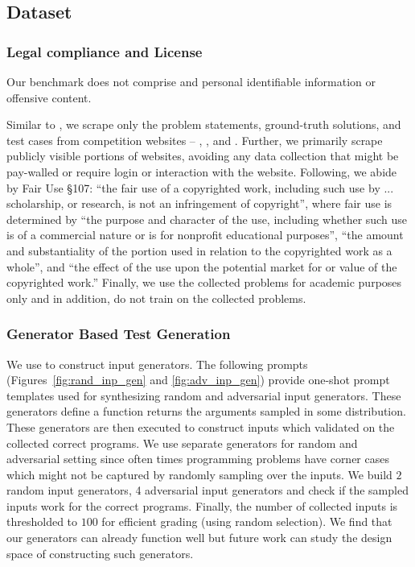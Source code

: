 \subsection{Dataset}
\label{app:sec:dataset}

\subsubsection{Legal compliance and License}
Our benchmark does not comprise and personal identifiable information or offensive content.

Similar to \citep{hendrycks2021measuring}, we scrape only the problem statements, ground-truth solutions, and test cases from competition websites -- \leetcode{}, \atcoder{}, and \codeforces{}. 
Further, we primarily scrape publicly visible portions of websites, avoiding any data collection that might be pay-walled or require login or interaction with the website.
Following, \citep{hendrycks2021measuring} we abide by Fair Use §107: “the fair
use of a copyrighted work, including such use by ... scholarship, or research, is not an infringement
of copyright”, where fair use is determined by “the purpose and character of the use, including
whether such use is of a commercial nature or is for nonprofit educational purposes”, “the amount
and substantiality of the portion used in relation to the copyrighted work as a whole”, and “the effect
of the use upon the potential market for or value of the copyrighted work.” 
Finally, we use the collected problems for academic purposes only and in addition, do not train on the collected problems.



\subsubsection{Generator Based Test Generation}
\label{appendix:input-generators}
We use \gptfourturbo{} to construct input generators. 
The following prompts (Figures~\ref{fig:rand_inp_gen} and \ref{fig:adv_inp_gen}) provide one-shot prompt templates used for synthesizing random and adversarial input generators.
These generators define a function returns the arguments sampled in some distribution.
These generators are then executed to construct inputs which validated on the collected correct programs.
We use separate generators for random and adversarial setting since often times programming problems have corner cases which might not be captured by randomly sampling over the inputs. We build $2$ random input generators, 4 adversarial input generators and check if the sampled inputs work for the correct programs. Finally, the number of collected inputs is thresholded to $100$ for efficient grading (using random selection). We find that our generators can already function well but future work can study the design space of constructing such generators. 

